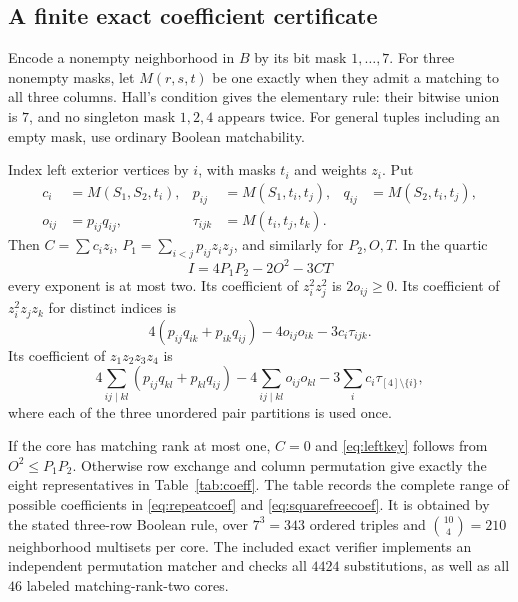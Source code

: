 \subsection{A finite exact coefficient certificate}
Encode a nonempty neighborhood in $B$ by its bit mask $1,\ldots,7$. For three nonempty masks, let $M(r,s,t)$ be one exactly when they admit a matching to all three columns. Hall's condition gives the elementary rule: their bitwise union is $7$, and no singleton mask $1,2,4$ appears twice. For general tuples including an empty mask, use ordinary Boolean matchability.

Index left exterior vertices by $i$, with masks $t_i$ and weights $z_i$. Put
\begin{align*}
 c_i&=M(S_1,S_2,t_i),&p_{ij}&=M(S_1,t_i,t_j),&q_{ij}&=M(S_2,t_i,t_j),\\
 o_{ij}&=p_{ij}q_{ij},&\tau_{ijk}&=M(t_i,t_j,t_k).
\end{align*}
Then $C=\sum c_iz_i$, $P_1=\sum_{i<j}p_{ij}z_iz_j$, and similarly for $P_2,O,T$. In the quartic
\[
 I=4P_1P_2-2O^2-3CT
\]
every exponent is at most two. Its coefficient of $z_i^2z_j^2$ is $2o_{ij}\ge0$. Its coefficient of $z_i^2z_jz_k$ for distinct indices is
\begin{equation}\label{eq:repeatcoef}
 4(p_{ij}q_{ik}+p_{ik}q_{ij})-4o_{ij}o_{ik}-3c_i\tau_{ijk}.
\end{equation}
Its coefficient of $z_1z_2z_3z_4$ is
\begin{equation}\label{eq:squarefreecoef}
 4\sum_{ij\mid kl}(p_{ij}q_{kl}+p_{kl}q_{ij})
 -4\sum_{ij\mid kl}o_{ij}o_{kl}
 -3\sum_i c_i\tau_{[4]\setminus\{i\}},
\end{equation}
where each of the three unordered pair partitions is used once.

If the core has matching rank at most one, $C=0$ and \eqref{eq:leftkey} follows from $O^2\le P_1P_2$. Otherwise row exchange and column permutation give exactly the eight representatives in Table~\ref{tab:coeff}. The table records the complete range of possible coefficients in \eqref{eq:repeatcoef} and \eqref{eq:squarefreecoef}. It is obtained by the stated three-row Boolean rule, over $7^3=343$ ordered triples and $\binom{10}{4}=210$ neighborhood multisets per core. The included exact verifier implements an independent permutation matcher and checks all $4424$ substitutions, as well as all $46$ labeled matching-rank-two cores.


